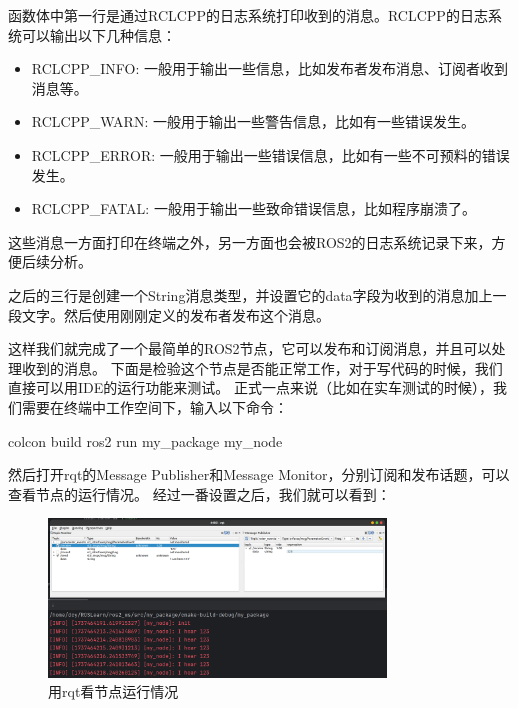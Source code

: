 函数体中第一行是通过RCLCPP的日志系统打印收到的消息。RCLCPP的日志系统可以输出以下几种信息：
\begin{itemize}
    \item RCLCPP\_INFO: 一般用于输出一些信息，比如发布者发布消息、订阅者收到消息等。
    \item RCLCPP\_WARN: 一般用于输出一些警告信息，比如有一些错误发生。
    \item RCLCPP\_ERROR: 一般用于输出一些错误信息，比如有一些不可预料的错误发生。
    \item RCLCPP\_FATAL: 一般用于输出一些致命错误信息，比如程序崩溃了。
\end{itemize}
这些消息一方面打印在终端之外，另一方面也会被ROS2的日志系统记录下来，方便后续分析。

之后的三行是创建一个String消息类型，并设置它的data字段为收到的消息加上一段文字。然后使用刚刚定义的发布者发布这个消息。

这样我们就完成了一个最简单的ROS2节点，它可以发布和订阅消息，并且可以处理收到的消息。
下面是检验这个节点是否能正常工作，对于写代码的时候，我们直接可以用IDE的运行功能来测试。
正式一点来说（比如在实车测试的时候），我们需要在终端中工作空间下，输入以下命令：
\begin{tbash}
    colcon build
    ros2 run my_package my_node
\end{tbash}
然后打开rqt的Message Publisher和Message Monitor，分别订阅和发布话题，可以查看节点的运行情况。
经过一番设置之后，我们就可以看到：
\begin{figure}[h]
    \centering
    \includegraphics[width=0.8\textwidth]{Chapter4/img/rqt_vision.png}
    \caption{用rqt看节点运行情况}
\end{figure}

